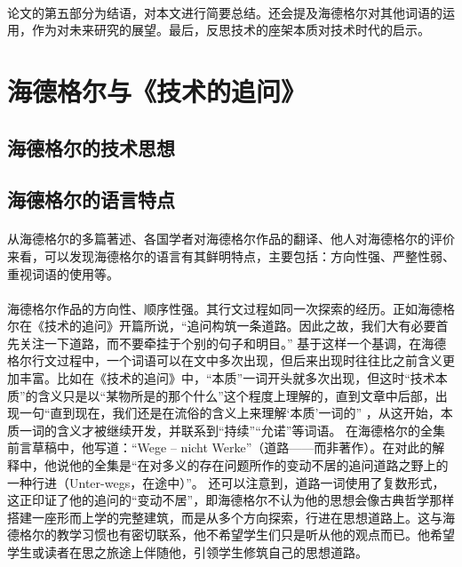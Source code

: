 \documentclass{article}
\begin{document}
        \paragraph{}
        论文的第五部分为结语，对本文进行简要总结。还会提及海德格尔对其他词语的运用，作为对未来研究的展望。最后，反思技术的座架本质对技术时代的启示。
\section{海德格尔与《技术的追问》} 
	\subsection{海德格尔的技术思想}
		\paragraph{}
	\subsection{海德格尔的语言特点}
		\paragraph{}
		从海德格尔的多篇著述、各国学者对海德格尔作品的翻译、他人对海德格尔的评价来看，可以发现海德格尔的语言有其鲜明特点，主要包括：方向性强、严整性弱、重视词语的使用等。
		\paragraph{}
		海德格尔作品的方向性、顺序性强。其行文过程如同一次探索的经历。正如海德格尔在《技术的追问》开篇所说，“追问构筑一条道路。因此之故，我们大有必要首先关注一下道路，而不要牵挂于个别的句子和明目。”
\cite{slct_Hei_Szx}
基于这样一个基调，在海德格尔行文过程中，一个词语可以在文中多次出现，但后来出现时往往比之前含义更加丰富。比如在《技术的追问》中，“本质”一词开头就多次出现，但这时“技术本质”的含义只是以“某物所是的那个什么”这个程度上理解的，直到文章中后部，出现一句“直到现在，我们还是在流俗的含义上来理解‘本质’一词的”
\cite{slct_Hei_Szx}
，从这开始，本质一词的含义才被继续开发，并联系到“持续”“允诺”等词语。
在海德格尔的全集前言草稿中，他写道：“Wege – nicht Werke”（道路——而非著作）。在对此的解释中，他说他的全集是“在对多义的存在问题所作的变动不居的追问道路之野上的一种行进（Unter-wegs，在途中）”。
\cite{sprach_sein_Szx}
还可以注意到，道路一词使用了复数形式，这正印证了他的追问的“变动不居”，即海德格尔不认为他的思想会像古典哲学那样搭建一座形而上学的完整建筑，而是从多个方向探索，行进在思想道路上。这与海德格尔的教学习惯也有密切联系，他不希望学生们只是听从他的观点而已。他希望学生或读者在思之旅途上伴随他，引领学生修筑自己的思想道路。
\end{document}
